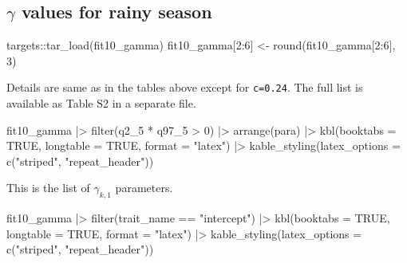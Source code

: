 \documentclass[
  11pt,
  letterpaper,
  DIV=11,
  numbers=noendperiod]{scrartcl}
\newenvironment{Shaded}{}{}
\newcommand{\AttributeTok}[1]{\textcolor[rgb]{0.84,0.23,0.29}{#1}}
\newcommand{\ConstantTok}[1]{\textcolor[rgb]{0.00,0.36,0.77}{#1}}
\newcommand{\DecValTok}[1]{\textcolor[rgb]{0.00,0.36,0.77}{#1}}
\newcommand{\FunctionTok}[1]{\textcolor[rgb]{0.44,0.26,0.76}{#1}}
\newcommand{\NormalTok}[1]{\textcolor[rgb]{0.14,0.16,0.18}{#1}}
\newcommand{\OtherTok}[1]{\textcolor[rgb]{0.44,0.26,0.76}{#1}}
\newcommand{\SpecialCharTok}[1]{\textcolor[rgb]{0.00,0.36,0.77}{#1}}
\newcommand{\StringTok}[1]{\textcolor[rgb]{0.01,0.18,0.38}{#1}}
\begin{document}
\hypertarget{gamma-values-for-rainy-season}{%
\subsection{\texorpdfstring{\(\gamma\) values for rainy
season}{\textbackslash gamma values for rainy season}}\label{gamma-values-for-rainy-season}}

\begin{Shaded}
\begin{Highlighting}[]
\NormalTok{targets}\SpecialCharTok{::}\FunctionTok{tar\_load}\NormalTok{(fit10\_gamma)}
\NormalTok{fit10\_gamma[}\DecValTok{2}\SpecialCharTok{:}\DecValTok{6}\NormalTok{] }\OtherTok{\textless{}{-}} \FunctionTok{round}\NormalTok{(fit10\_gamma[}\DecValTok{2}\SpecialCharTok{:}\DecValTok{6}\NormalTok{], }\DecValTok{3}\NormalTok{)}
\end{Highlighting}
\end{Shaded}

Details are same as in the tables above except for \texttt{c=0.24}. The
full list is available as Table S2 in a separate file.

\begin{Shaded}
\begin{Highlighting}[]
\NormalTok{fit10\_gamma }\SpecialCharTok{|\textgreater{}}
  \FunctionTok{filter}\NormalTok{(q2\_5 }\SpecialCharTok{*}\NormalTok{ q97\_5 }\SpecialCharTok{\textgreater{}} \DecValTok{0}\NormalTok{) }\SpecialCharTok{|\textgreater{}}
  \FunctionTok{arrange}\NormalTok{(para) }\SpecialCharTok{|\textgreater{}}
  \FunctionTok{kbl}\NormalTok{(}\AttributeTok{booktabs =} \ConstantTok{TRUE}\NormalTok{, }\AttributeTok{longtable =} \ConstantTok{TRUE}\NormalTok{, }\AttributeTok{format =} \StringTok{"latex"}\NormalTok{) }\SpecialCharTok{|\textgreater{}}
  \FunctionTok{kable\_styling}\NormalTok{(}\AttributeTok{latex\_options =} \FunctionTok{c}\NormalTok{(}\StringTok{"striped"}\NormalTok{, }\StringTok{"repeat\_header"}\NormalTok{))}
\end{Highlighting}
\end{Shaded}

This is the list of \(\gamma_{k,1}\) parameters.

\begin{Shaded}
\begin{Highlighting}[]
\NormalTok{fit10\_gamma }\SpecialCharTok{|\textgreater{}}
  \FunctionTok{filter}\NormalTok{(trait\_name }\SpecialCharTok{==} \StringTok{"intercept"}\NormalTok{) }\SpecialCharTok{|\textgreater{}}
  \FunctionTok{kbl}\NormalTok{(}\AttributeTok{booktabs =} \ConstantTok{TRUE}\NormalTok{, }\AttributeTok{longtable =} \ConstantTok{TRUE}\NormalTok{, }\AttributeTok{format =} \StringTok{"latex"}\NormalTok{) }\SpecialCharTok{|\textgreater{}}
  \FunctionTok{kable\_styling}\NormalTok{(}\AttributeTok{latex\_options =} \FunctionTok{c}\NormalTok{(}\StringTok{"striped"}\NormalTok{, }\StringTok{"repeat\_header"}\NormalTok{))}
\end{Highlighting}
\end{Shaded}
\end{document}
